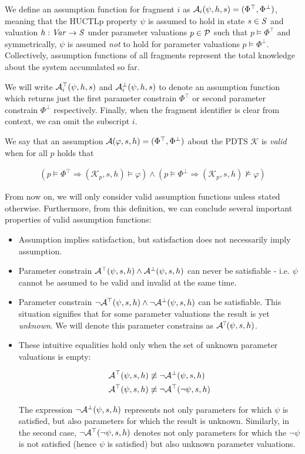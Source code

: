 We define an assumption function for fragment $i$ as $\mathcal{A}_i(\psi, h, s) = (\Phi^\top, \Phi^\bot)$, meaning that the \ac{HUCTLp} property $\psi$ is assumed to hold in state $s \in \mathit{S}$ and valuation $h : \mathit{Var} \to \mathit{S}$ under parameter valuations $p \in \mathcal{P}$ such that $p \models \Phi^\top$ and symmetrically, $\psi$ is assumed \emph{not} to hold for parameter valuations $p \models \Phi^\bot$. Collectively, assumption functions of all fragments represent the total knowledge about the system accumulated so far.

We will write $\mathcal{A}^\top_i(\psi, h, s)$ and $\mathcal{A}^\bot_i(\psi, h, s)$ to denote an assumption function which returns just the first parameter constrain $\Phi^\top$ or second parameter constrain $\Phi^\bot$ respectively. Finally, when the fragment identifier is clear from context, we can omit the subscript $i$.

We say that an assumption $\mathcal{A}(\varphi, s, h) = (\Phi^\top, \Phi^\bot)$ about the \ac{PDTS} $\mathcal{K}$ is \emph{valid} when for all $p$ holds that

\begin{align*}
	(p \models \Phi^\top \Rightarrow (\mathcal{K}_p, s, h) \models \varphi) \land (p \models \Phi^\bot \Rightarrow (\mathcal{K}_p, s, h) \not\models \varphi) 
\end{align*}

From now on, we will only consider valid assumption functions unless stated otherwise. Furthermore, from this definition, we can conclude several important properties of valid assumption functions:

\begin{itemize}
	\item Assumption implies satisfaction, but satisfaction does not necessarily imply assumption.
	\item Parameter constrain $\mathcal{A}^\top(\psi, s, h) \land \mathcal{A}^\bot(\psi, s, h)$ can never be satisfiable - i.e. $\psi$ cannot be assumed to be valid and invalid at the same time.
	\item Parameter constrain $\neg\mathcal{A}^\top(\psi, s, h) \land \neg\mathcal{A}^\bot(\psi, s, h)$ can be satisfiable. This situation signifies that for some parameter valuations the result is yet \emph{unknown}. We will denote this parameter constrains as $\mathcal{A}^?(\psi, s, h)$.
	\item These intuitive equalities hold only when the set of unknown parameter valuations is empty:
	
	\begin{align*}
		\mathcal{A}^\top(\psi, s, h) & \not\equiv \neg \mathcal{A}^\bot(\psi, s, h) \\
		\mathcal{A}^\top(\psi, s, h) & \not\equiv \neg \mathcal{A}^\top(\neg \psi, s, h)
	\end{align*}
	
	The expression $\neg \mathcal{A}^\bot(\psi, s, h)$ represents not only parameters for which $\psi$ is satisfied, but also parameters for which the result is unknown. Similarly, in the second case, $\neg \mathcal{A}^\top(\neg \psi, s, h)$ denotes not only parameters for which the $\neg \psi$ is not satisfied (hence $\psi$ is satisfied) but also unknown parameter valuations.
	
\end{itemize}

